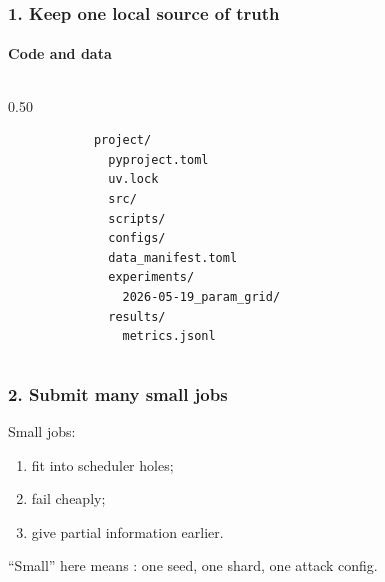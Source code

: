 \documentclass[10pt,aspectratio=169,notheorems]{beamer}
\begin{document}
\begin{frame}[fragile]
    \frametitle{1. Keep one local source of truth}
    \framesubtitle{Code and data}
    \begin{columns}[t]
        \begin{column}{0.50\textwidth}
        \begin{verbatim}
            project/
              pyproject.toml
              uv.lock
              src/
              scripts/
              configs/
              data_manifest.toml
              experiments/
                2026-05-19_param_grid/
              results/
                metrics.jsonl
        \end{verbatim}
        \end{column}

    \end{columns}
\end{frame}

\begin{frame}[fragile]
    \frametitle{2. Submit many small jobs}
    Small jobs:
    \begin{enumerate}
        \item fit into scheduler holes;
        \item fail cheaply;
        \item give partial information earlier.
    \end{enumerate}

    \vspace{2em}
    \textcolor{SlidemintMuted}{``Small'' here means : one seed, one shard, one attack config.}
\end{frame}
\end{document}
